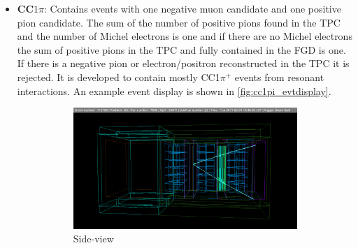 \begin{itemize}
	\item \textbf{CC$1\pi$}: Contains events with one negative muon candidate and one positive pion candidate. The sum of the number of positive pions found in the TPC and the number of Michel electrons is one and if there are no Michel electrons the sum of positive pions in the TPC and fully contained in the FGD is one. If there is a negative pion or electron/positron reconstructed in the TPC it is rejected. It is developed to contain mostly CC1$\pi^{+}$ events from resonant interactions. An example event display is shown in \autoref{fig:cc1pi_evtdisplay}.
	\begin{figure}[h]
		\begin{subfigure}[t]{0.49\textwidth}
			\includegraphics[width=\textwidth, trim={50mm 30mm 50mm 40mm}, clip]{figures/numu/evtdisplay/CC1pi_7508_22_119769_perpX0Z_all}
			\caption{Side-view}
		\end{subfigure}
		\begin{subfigure}[t]{0.49\textwidth}

\end{subfigure}
\end{figure}
\end{itemize}
